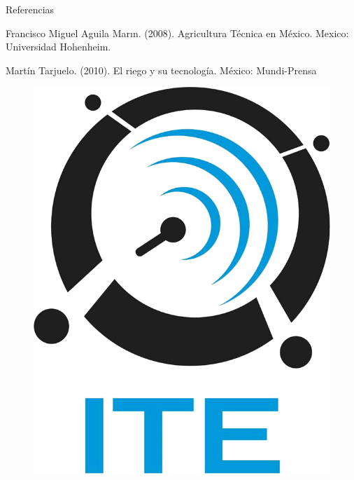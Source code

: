 \documentclass{beamer}
\begin{document}
\begin{frame}[fragile]{}
\begin{columns}[t]
\begin{column}{0.90\linewidth}
\begin{block}{Referencias}
\begin{minipage}[t]{0.71\textwidth}
\begin{small}
\begin{thebibliography}{widestlabel}
        	 Francisco Miguel Aguila Marın. (2008). Agricultura Técnica en México. Mexico: Universidad Hohenheim.
        	
        	
        	 Martín Tarjuelo. (2010). El riego y su tecnología. México: Mundi-Prensa
        	
        \end{thebibliography}
        \end{small}
        \end{minipage}
        \hfill
           \begin{minipage}[t]{0.25\textwidth}
           	\vspace{0pt}
           	\begin{center}
           		\begin{figure}
           			\includegraphics[scale=0.2]{../graphics/ite.png} 
           		\end{figure}
           	\end{center}
           \end{minipage}
      \end{block}
   \end{column}
\end{columns}

\end{frame}
\end{document}
